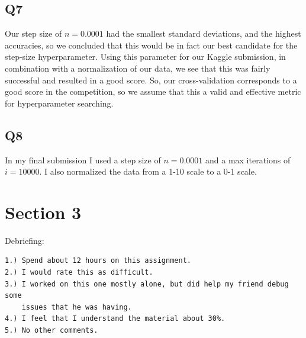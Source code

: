 \documentclass{article}
\theoremstyle{definition}
\begin{document}
    \subsection*{Q7}
Our step size of $n = 0.0001$ had the smallest standard deviations, and the 
highest accuracies, so we concluded that this would be in fact our best candidate for 
the step-size hyperparameter. Using this parameter for our Kaggle submission, in 
combination with a normalization of our data, we see that this was fairly successful and 
resulted in a good score. So, our cross-validation corresponds to a good score in the competition,
so we assume that this a valid and effective metric for hyperparameter searching.
    \subsection*{Q8}
In my final submission I used a step size of $n = 0.0001$ and a max iterations of $i = 10000$. 
I also normalized the data from a 1-10 scale to a 0-1 scale.
\section*{Section 3}
Debriefing:
\begin{verbatim}
1.) Spend about 12 hours on this assignment.
2.) I would rate this as difficult.
3.) I worked on this one mostly alone, but did help my friend debug some 
    issues that he was having.
4.) I feel that I understand the material about 30%.
5.) No other comments.
\end{verbatim}
\end{document}
